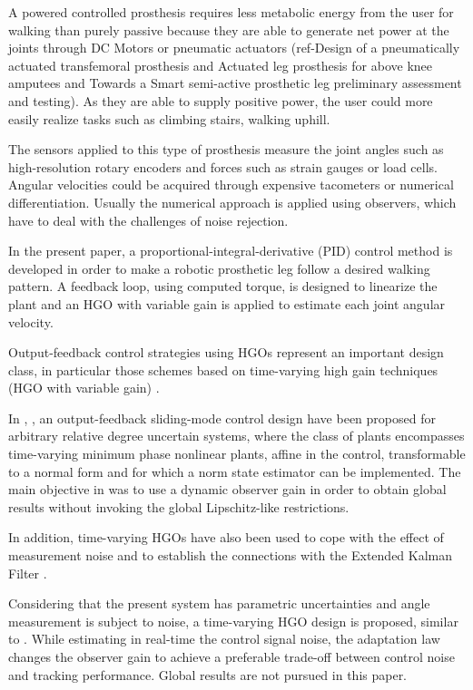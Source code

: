 \documentclass[letterpaper, 10 pt, journal, twocolumn]{IEEEtran}  %
\theoremstyle{plain}
\theoremstyle{definition}
\theoremstyle{remark}
\begin{document}
A powered controlled prosthesis requires less metabolic energy from the user for walking than purely passive because they are able to generate net power at the joints through DC Motors or pneumatic actuators (ref-Design of a pneumatically actuated transfemoral prosthesis and Actuated leg prosthesis for above knee amputees and Towards a Smart semi-active prosthetic leg preliminary assessment and testing). As they are able to supply positive power, the user could more easily realize tasks such as climbing stairs, walking uphill.

The sensors applied to this type of prosthesis measure the joint angles such as high-resolution rotary encoders and forces such as strain gauges or load cells. Angular velocities could be acquired through expensive tacometers or numerical differentiation. Usually the numerical approach is applied using observers, which have to deal with the challenges of noise rejection.  

In the present paper, a proportional-integral-derivative (PID) control method is developed in order to make a robotic prosthetic leg follow a desired walking pattern. A feedback loop, using computed torque, is designed to linearize the plant and an HGO with variable gain is applied to estimate each joint angular velocity. 

Output-feedback control strategies using HGOs \cite{OK:97}
represent an important design class, in particular those schemes based on time-varying high gain
techniques (HGO with variable gain) \cite{P:01}\cite{KKJ:02}
\cite{KKC:03}\cite{LL:05}\cite{AK:07}.

In \cite{POH:2011}, \cite{PHCL:2007}, an output-feedback sliding-mode control design have been proposed for arbitrary relative
degree uncertain systems, where the class of plants encompasses time-varying minimum phase nonlinear plants, affine
in the control, transformable to a normal form and for which a
norm state estimator can be implemented. The main objective in \cite{POH:2011} was to use a dynamic observer gain in order to obtain global results without invoking the global Lipschitz-like restrictions. 

In addition, time-varying HGOs have also been used to cope with the effect of
measurement noise and to establish the connections with the
Extended Kalman Filter \cite{AK:07}\cite{AK:09}.

Considering that the present system has parametric uncertainties and angle measurement is subject to noise, a time-varying HGO design is proposed, similar to \cite{POH:2011}. While estimating in real-time the control signal noise, the adaptation law changes the observer gain to achieve a preferable trade-off between control noise and tracking performance. Global results are not pursued in this paper.
\end{document}
